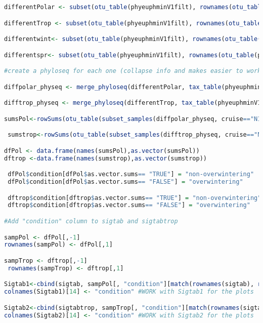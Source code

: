 \documentclass{article}
\begin{document}
\begin{lstlisting}[language=R,caption={N1N2figscripts}]
differentPolar <- subset(otu_table(phyeuphminV1filt), rownames(otu_table(phyeuphminV1filt)) %in% sigtab_names)

differentTrop <- subset(otu_table(phyeuphminV1filt), rownames(otu_table(phyeuphminV1filt)) %in% sigtabtrop_names)

differentwint<- subset(otu_table(phyeuphminV1filt), rownames(otu_table(phyeuphminV1filt)) %in% sigtabwint_names)

differentspr<- subset(otu_table(phyeuphminV1filt), rownames(otu_table(phyeuphminV1filt)) %in% sigtabspr_names)

#create a phyloseq for each one (collapse info and makes easier to work with them) Just for the moment only seasonal comparison POLAR and TROPCIAL

diffpolar_physeq <- merge_phyloseq(differentPolar, tax_table(phyeuphminV1filt), sample_data(phyeuphminV1filt), phy_tree(phyeuphminV1filt))

difftrop_physeq <- merge_phyloseq(differentTrop, tax_table(phyeuphminV1filt), sample_data(phyeuphminV1filt), phy_tree(phyeuphminV1filt))

sumsPol<-rowSums(otu_table(subset_samples(diffpolar_physeq, cruise=="N1")))==0 #if it is == 0 means that we didn’t detect in any samples above 100m  

 sumstrop<-rowSums(otu_table(subset_samples(difftrop_physeq, cruise=="N1"))) ==0 #if it is == 0 means that we didn’t detect in any samples above 100m  

dfPol <- data.frame(names(sumsPol),as.vector(sumsPol))
dftrop <-data.frame(names(sumstrop),as.vector(sumstrop))

 dfPol$condition[dfPol$as.vector.sums== "TRUE"] = "non-overwintering"
 dfPol$condition[dfPol$as.vector.sums== "FALSE"] = "overwintering"

 dftrop$condition[dftrop$as.vector.sums== "TRUE"] = "non-overwintering"
 dftrop$condition[dftrop$as.vector.sums== "FALSE"] = "overwintering"

#Add "condition" column to sigtab and sigtabtrop 

sampPol <- dfPol[,-1]
rownames(sampPol) <- dfPol[,1]

sampTrop <- dftrop[,-1]
 rownames(sampTrop) <- dftrop[,1]

Sigtab1<-cbind(sigtab, sampPol[, "condition"][match(rownames(sigtab), rownames(sampPol))])
colnames(Sigtab1)[14] <- "condition" #WORK with Sigtab1 for the plots 

Sigtab2<-cbind(sigtabtrop, sampTrop[, "condition"][match(rownames(sigtabtrop), rownames(sampTrop))])
colnames(Sigtab2)[14] <- "condition" #WORK with Sigtab2 for the plots 


\end{lstlisting}
\end{document}
